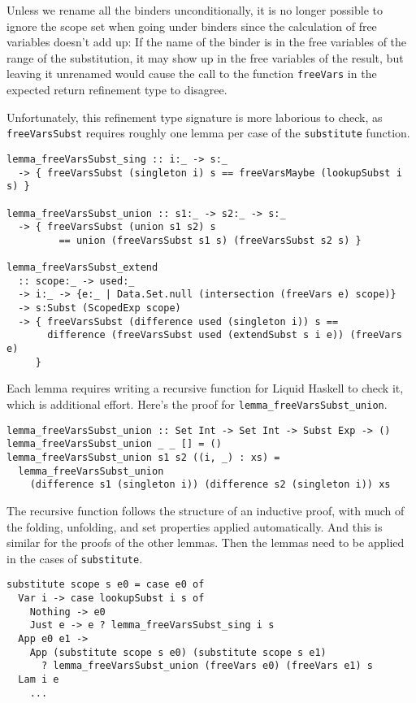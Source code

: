 \documentclass[acmtog, anonymous]{acmart}
\newcommand{\tc}[1]{{\small\texttt{#1}}}
\begin{document}
Unless we rename all the binders unconditionally, it is no longer
possible to ignore the scope set when going under binders since the calculation
of free variables doesn't add up:
If the name of the binder is in the free variables of the range of the substitution,
it may show up in the free variables of the result, but leaving it unrenamed would
cause the call to the function \tc{freeVars} in the expected return refinement type
to disagree.

Unfortunately, this refinement type signature is more laborious to check, as
\tc{free\-Vars\-Subst} requires roughly one lemma per case of the \tc{subs\-ti\-tute}
function.

\begin{verbatim}
lemma_freeVarsSubst_sing :: i:_ -> s:_
  -> { freeVarsSubst (singleton i) s == freeVarsMaybe (lookupSubst i s) }

lemma_freeVarsSubst_union :: s1:_ -> s2:_ -> s:_
  -> { freeVarsSubst (union s1 s2) s
         == union (freeVarsSubst s1 s) (freeVarsSubst s2 s) }

lemma_freeVarsSubst_extend
  :: scope:_ -> used:_
  -> i:_ -> {e:_ | Data.Set.null (intersection (freeVars e) scope)}
  -> s:Subst (ScopedExp scope)
  -> { freeVarsSubst (difference used (singleton i)) s ==
       difference (freeVarsSubst used (extendSubst s i e)) (freeVars e)
     }
\end{verbatim}

Each lemma requires writing a recursive function for Liquid Haskell to
check it, which is additional effort. Here's the proof for
\tc{lemma\_free\-Vars\-Subst\_union}.

\begin{verbatim}
lemma_freeVarsSubst_union :: Set Int -> Set Int -> Subst Exp -> ()
lemma_freeVarsSubst_union _ _ [] = ()
lemma_freeVarsSubst_union s1 s2 ((i, _) : xs) =
  lemma_freeVarsSubst_union
    (difference s1 (singleton i)) (difference s2 (singleton i)) xs
\end{verbatim}

The recursive function follows the structure of an inductive proof,
with much of the folding, unfolding, and set properties applied
automatically. And this is similar for the proofs of the other lemmas.
Then the lemmas need to be applied in the cases of \tc{substitute}.

\begin{verbatim}
substitute scope s e0 = case e0 of
  Var i -> case lookupSubst i s of
    Nothing -> e0
    Just e -> e ? lemma_freeVarsSubst_sing i s
  App e0 e1 ->
    App (substitute scope s e0) (substitute scope s e1)
      ? lemma_freeVarsSubst_union (freeVars e0) (freeVars e1) s
  Lam i e
    ...
\end{verbatim}
\end{document}
